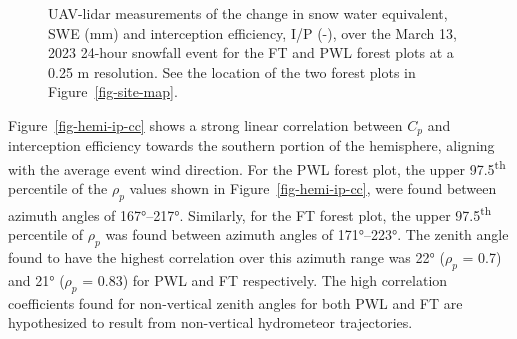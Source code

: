 \documentclass[
  letterpaper,
  DIV=11,
  numbers=noendperiod]{scrartcl}
\begin{document}
\begin{figure}[H]


\caption{\label{fig-lidar-tf-ip}UAV-lidar measurements of the change in
snow water equivalent, SWE (mm) and interception efficiency, I/P (-),
over the March 13, 2023 24-hour snowfall event for the FT and PWL forest
plots at a 0.25 m resolution. See the location of the two forest plots
in Figure~\ref{fig-site-map}.}

\end{figure}%

Figure~\ref{fig-hemi-ip-cc} shows a strong linear correlation between
\(C_p\) and interception efficiency towards the southern portion of the
hemisphere, aligning with the average event wind direction. For the PWL
forest plot, the upper 97.5\textsuperscript{th} percentile of the
\(\rho_p\) values shown in Figure~\ref{fig-hemi-ip-cc}, were found
between azimuth angles of 167°--217°. Similarly, for the FT forest plot,
the upper 97.5\textsuperscript{th} percentile of \(\rho_p\) was found
between azimuth angles of 171°--223°. The zenith angle found to have the
highest correlation over this azimuth range was 22° (\(\rho_p\) = 0.7)
and 21° (\(\rho_p\) = 0.83) for PWL and FT respectively. The high
correlation coefficients found for non-vertical zenith angles for both
PWL and FT are hypothesized to result from non-vertical hydrometeor
trajectories.
\end{document}
